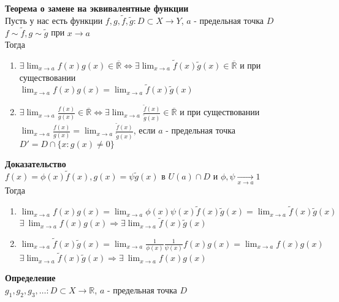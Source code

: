 \documentclass[12pt]{article}
\begin{document}
\textbf{Теорема о замене на эквивалентные функции}\\
Пусть у нас есть функции $f,g,\widetilde{f}, \widetilde{g}: D \subset X \rightarrow Y$, $a$ - предельная точка $D$\\
$f \sim \widetilde{f}, g \sim \widetilde{g}$ при $x \rightarrow a$\\
Тогда
\begin{enumerate}
    \item $\exists\lim_{x\rightarrow a} f(x)g(x) \in \overline{\mathbb{R}} \Leftrightarrow \exists\lim_{x\rightarrow a} \widetilde{f}(x)\widetilde{g}(x) \in \overline{\mathbb{R}}$ и при существовании\\
    $\lim_{x\rightarrow a} f(x)g(x) = \lim_{x\rightarrow a} \widetilde{f}(x)\widetilde{g}(x)$
    \item $\exists\lim_{x\rightarrow a} \frac{f(x)}{g(x)} \in \overline{\mathbb{R}} \Leftrightarrow \exists\lim_{x\rightarrow a} \frac{\widetilde{f}(x)}{\widetilde{g}(x)} \in \overline{\mathbb{R}}$ и при существовании\\
    $\lim_{x\rightarrow a} \frac{f(x)}{g(x)} = \lim_{x\rightarrow a} \frac{\widetilde{f}(x)}{\widetilde{g}(x)}$, если $a$ - предельная точка $D'=D\cap \{x: g(x) \neq 0\}$
\end{enumerate}
\textbf{Доказательство}\\
$f(x) = \phi(x)\widetilde{f}(x), g(x) = \psi\widetilde{g}(x)$ в $U(a) \cap D$ и $\phi, \psi \xrightarrow[x\rightarrow a]{} 1$\\
Тогда
\begin{enumerate}
    \item $\lim_{x\rightarrow a} f(x)g(x) = \lim_{x\rightarrow a} \phi(x)\psi(x)\widetilde{f}(x)\widetilde{g}(x) = \lim_{x\rightarrow a} \widetilde{f}(x)\widetilde{g}(x)$\\
    $\exists\ \lim_{x\rightarrow a} f(x)g(x) \Rightarrow \exists\lim_{x\rightarrow a} \widetilde{f}(x)\widetilde{g}(x)$
    \item $\lim_{x\rightarrow a} \widetilde{f}(x)\widetilde{g}(x) = \lim_{x\rightarrow a} \frac1{\phi(x)}\frac1{\psi(x)}f(x)g(x) = \lim_{x\rightarrow a} f(x)g(x)$\\
    $\exists\lim_{x\rightarrow a} \widetilde{f}(x)\widetilde{g}(x) \Rightarrow \exists\ \lim_{x\rightarrow a} f(x)g(x)$
\end{enumerate}
\textbf{Определение}\\
$g_1,g_2,g_3,\ldots: D\subset X\rightarrow \mathbb{R}$, $a$ - предельная точка $D$\\
\end{document}
